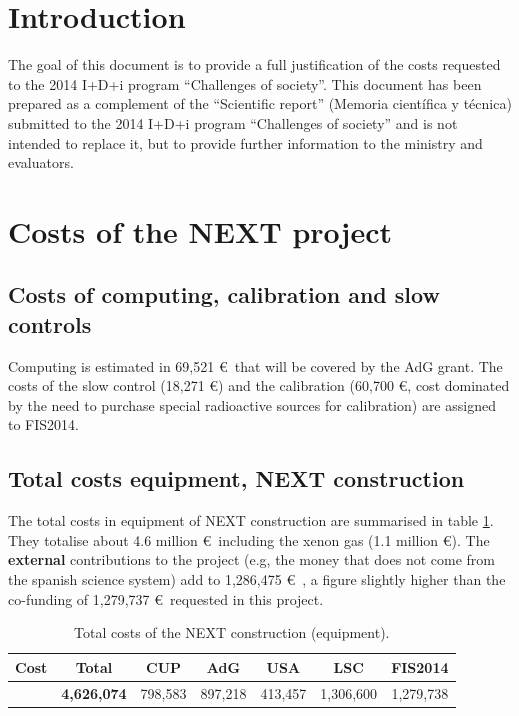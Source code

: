 \documentclass[a4paper,11pt,oneside]{article}
\begin{document}
\section{\bf Introduction}
\label{sec.intro}
The goal of this document is to provide a full justification of the costs requested to the 2014 I+D+i program
``Challenges of society''. This document has been prepared as a complement of the ``Scientific report'' (Memoria científica y técnica) submitted to the 2014 I+D+i program
``Challenges of society'' and is not intended to replace it, but to provide further information to the ministry and evaluators. 


\section{\bf Costs of the NEXT project}
\label{next.costs}





\subsection{Costs of computing, calibration and slow controls}
Computing is estimated in 69,521 \euro\ that will be covered by the AdG grant. The costs of the slow control (18,271 \euro) and the calibration (60,700 \euro, cost dominated by the need to purchase special radioactive sources for calibration) are assigned to FIS2014. 

\subsection{Total costs equipment, NEXT construction}
The total costs in equipment of NEXT construction are summarised in table  \ref{tab.TotalE}. They totalise about 4.6 million \euro\ including the xenon gas (1.1 million \euro). The {\bf external} contributions to the project (e.g, the money that does not come from the spanish science system)
add to 1,286,475 \euro\ ,  a figure slightly higher than the co-funding of 1,279,737  \euro\ 
requested in this project. 

\begin{table}[h!]
\begin{center}
\begin{tabular}{|l|c|c|c|c|c|c|}
\hline
Cost	& Total &	CUP &	AdG	& USA &	LSC &	FIS2014 \\
 \hline
& {\bf 4,626,074} &	798,583 & 	897,218 & 	413,457&	1,306,600 & 1,279,738 \\	
 \hline\hline
\end{tabular}  
\caption{Total costs of the NEXT construction (equipment).}
\label{tab.TotalE}
\end{center}
\end{table} 
\end{document}
